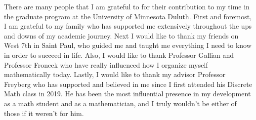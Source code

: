 There are many people that I am grateful to for their contribution to my time in the graduate program at the University of Minnesota Duluth. First and foremost, I am grateful to my family who has supported me extensively throughout the ups and downs of my academic journey. Next I would like to thank my friends on West 7th in Saint Paul, who guided me and taught me everything I need to know in order to succeed in life. Also, I would like to thank Professor Gallian and Professor Froncek who have really influenced how I organize myself mathematically today. Lastly, I would like to thank my advisor Professor Freyberg who has supported and believed in me since I first attended his Discrete Math class in 2019. He has been the most influential presence in my development as a math student and as a mathematician, and I truly wouldn't be either of those if it weren't for him.